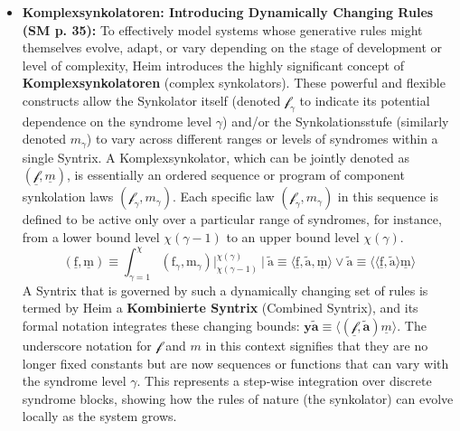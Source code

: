 \documentclass[12pt]{article}
\newcommand{\syntrix}{\bm{y\widetilde{a}}}
\newcommand{\metrophor}{\bm{\widetilde{a}}}
\newcommand{\synkolator}{\mathcal{f}}
\newcommand{\synkolationsstufe}{m}
\begin{document}
\begin{itemize}
    \item \textbf{Komplexsynkolatoren: Introducing Dynamically Changing Rules (SM p. 35):}
    To effectively model systems whose generative rules might themselves evolve, adapt, or vary depending on the stage of development or level of complexity, Heim introduces the highly significant concept of \textbf{Komplexsynkolatoren} (complex synkolators). These powerful and flexible constructs allow the Synkolator itself (denoted \( \synkolator_\gamma \) to indicate its potential dependence on the syndrome level \( \gamma \)) and/or the Synkolationsstufe (similarly denoted \( \synkolationsstufe_\gamma \)) to vary across different ranges or levels of syndromes within a single Syntrix. A Komplexsynkolator, which can be jointly denoted as \( (\underline{\synkolator}, \underline{\synkolationsstufe}) \), is essentially an ordered sequence or program of component synkolation laws \( (\synkolator_\gamma, \synkolationsstufe_\gamma) \). Each specific law \( (\synkolator_\gamma, \synkolationsstufe_\gamma) \) in this sequence is defined to be active only over a particular range of syndromes, for instance, from a lower bound level \( \chi(\gamma-1) \) to an upper bound level \( \chi(\gamma) \).
        \begin{equation}
        (\underline{\mathrm{f}}, \underline{\mathrm{m}}) \equiv \int_{\gamma=1}^\chi (\mathrm{f}_\gamma, \mathrm{m}_\gamma) \big|_{\chi(\gamma-1)}^{\chi(\gamma)} \ | \ \tilde{\mathrm{a}} \equiv \langle \underline{\mathrm{f}}, \tilde{\mathrm{a}}, \underline{\mathrm{m}} \rangle \lor \tilde{\mathrm{a}} \equiv \langle\langle \underline{\mathrm{f}}, \tilde{\mathrm{a}} \rangle \underline{\mathrm{m}} \rangle \tag{8}
        \label{eq:original_komplexsynkolator}
        \end{equation}
    A Syntrix that is governed by such a dynamically changing set of rules is termed by Heim a \textbf{Kombinierte Syntrix} (Combined Syntrix), and its formal notation integrates these changing bounds: \( \syntrix \equiv \langle (\underline{\synkolator}, \metrophor) \underline{\synkolationsstufe} \rangle \). The underscore notation for \( \synkolator \) and \( \synkolationsstufe \) in this context signifies that they are no longer fixed constants but are now sequences or functions that can vary with the syndrome level \( \gamma \). This represents a step-wise integration over discrete syndrome blocks, showing how the rules of nature (the synkolator) can evolve locally as the system grows.


\end{itemize}
\end{document}
